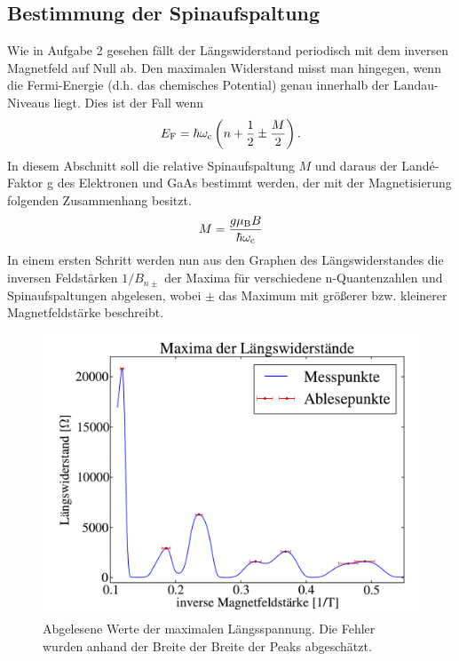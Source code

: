 \documentclass[paper=a4,fontsize=10pt,DIV=18,twocolumn,parskip=half]{scrartcl}
\numberwithin{equation}{section}    %
\begin{document}
\subsection{Bestimmung der Spinaufspaltung}
\label{a6}
Wie in Aufgabe 2 gesehen fällt der Längswiderstand periodisch mit dem inversen Magnetfeld auf Null ab. Den maximalen Widerstand misst man hingegen, wenn die Fermi-Energie (d.h. das chemisches Potential) genau innerhalb der Landau-Niveaus liegt. Dies ist der Fall wenn
\begin{equation}
E_{\rm F}=\hbar \omega_{\rm c}\left( n+\frac{1}{2}\pm\frac{M}{2}\right).
\end{equation}
In diesem Abschnitt soll die relative Spinaufspaltung $M$ und daraus der Landé-Faktor g des Elektronen und GaAs bestimmt werden, der mit der Magnetisierung folgenden Zusammenhang besitzt.
\begin{equation}
M=\frac{g \mu_{\rm B} B}{\hbar \omega_{\rm c}}
\label{lande}
\end{equation}
In einem ersten Schritt werden nun aus den Graphen des Längswiderstandes die inversen Feldstärken $1/B_{n\pm}$ der Maxima für verschiedene n-Quantenzahlen und Spinaufspaltungen abgelesen, wobei $\pm$ das Maximum mit größerer bzw. kleinerer Magnetfeldstärke beschreibt.

\begin{figure}[]
	\begin{center}
		\includegraphics[width=\columnwidth]{Data-Plots/07-maxima_ablesen.pdf}
		\caption{Abgelesene Werte der maximalen Längsspannung. Die Fehler wurden anhand der Breite der Breite der Peaks abgeschätzt.}
		\label{maxima}
	\end{center}
\end{figure}
\end{document}
